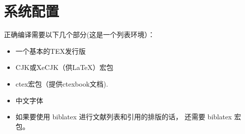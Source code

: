 
\chapter{系统配置}
正确编译需要以下几个部分(这是一个列表环境）：
\begin{itemize}
\item 一个基本的TEX发行版
\item CJK或XeCJK（供\LaTeX{}）宏包
\item ctex宏包（提供ctexbook文档).
\item 中文字体
\item 如果要使用 biblatex 进行文献列表和引用的排版的话， 还需要 biblatex 宏包。
\end{itemize}
